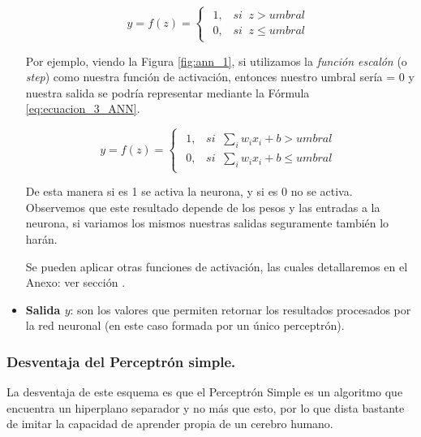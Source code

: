\documentclass[12pt,a4paper]{article}
\begin{document}
\begin{sloppypar}
\begin{itemize}
\begin{equation}\label{eq:ecuacion_2_ANN}
y = f(z) =  
\begin{cases}
\begin{array}{lr}
1, \;\;\;    si \;\; z > umbral \\
0, \;\;\;    si \;\; z \leq  umbral
\end{array}
\end{cases}
\end{equation}

Por ejemplo, viendo la Figura \ref{fig:ann_1}, si utilizamos la \textit{función escalón} (o \textit{step}) como nuestra función de activación, entonces nuestro umbral sería = 0 y nuestra salida se podría representar mediante la Fórmula \ref{eq:ecuacion_3_ANN}.

\begin{equation}\label{eq:ecuacion_3_ANN}
y = f(z) =  
\begin{cases}
\begin{array}{lr}
1,\;\;\;    si \;\; \sum_{i}w_{i}x_{i}+b > umbral \\
0,\;\;\;    si \;\; \sum_{i}w_{i}x_{i}+b \leq  umbral
\end{array}
\end{cases}
\end{equation}

De esta manera si es 1 se activa la neurona, y si es 0 no se activa. Observemos que este resultado depende de los pesos y las entradas a la neurona, si variamos los mismos nuestras salidas seguramente también lo harán.

Se pueden aplicar otras funciones de activación, las cuales detallaremos en el Anexo: ver sección \textit{}.

\item \textbf{Salida $y$}: son los valores que permiten retornar los resultados procesados por la red neuronal (en este caso formada por un único perceptrón).

\end{itemize}

\subsubsection{Desventaja del Perceptrón simple. }
La desventaja de este esquema es que el Perceptrón Simple es un algoritmo que encuentra un hiperplano separador y no más que esto, por lo que dista bastante de imitar la capacidad de aprender propia de un cerebro humano.


\end{sloppypar}
\end{document}
